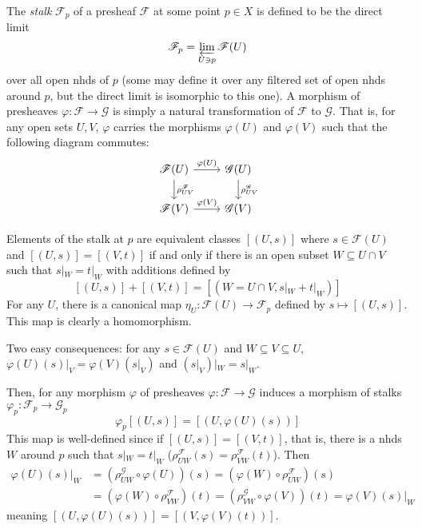 \documentclass[12pt]{article}
\theoremstyle{remark}
\begin{document}
    The \textit{stalk} $\mathscr F_p$ of a presheaf $\mathscr F$ at some point $p\in X$ is defined to be the direct limit
    \[\mathscr F_p=\varprojlim_{U\ni p} \mathscr F(U)\] 
    over all open nhds of $p$ (some may define it over any filtered set of open nhds around $p$, but the direct limit is isomorphic to this one). A morphism of presheaves $\varphi:\mathscr F\to\mathscr G$ is simply a natural transformation of $\mathscr F$ to $\mathscr G$. That is, for any open sets $U, V$, $\varphi$ carries the morphisms $\varphi(U)$ and $\varphi(V)$ such that the following diagram commutes:
    \[
\begin{tikzcd}
\mathscr F(U) \arrow[d, "\rho_{UV}^{\mathscr F}"] \arrow[r, "\varphi(U)"] & \mathscr G(U) \arrow[d, "\rho_{UV}^{\mathscr G}"] \\
\mathscr F(V) \arrow[r, "\varphi(V)"]                                     & \mathscr G(V)                                    
\end{tikzcd}    
    \]
    
    Elements of the stalk at $p$ are equivalent classes $[(U, s)]$ where $s\in\mathscr F(U)$ and $[(U, s)]=[(V, t)]$ if and only if there is an open subset $W\subseteq U\cap V$ such that $s|_W=t|_W$ with additions defined by 
    \[[(U, s)]+[(V, t)]=[(W=U\cap V,s|_W+t|_W)]\] 
    For any $U$, there is a canonical map $\eta_U:\mathscr F(U)\to \mathscr F_p$ defined by $s\mapsto [(U, s)]$. This map is clearly a homomorphism.
    
    Two easy consequences: for any $s\in\mathscr F(U)$ and $W\subseteq V\subseteq U$, $\varphi(U)(s)|_V=\varphi(V)(s|_V)$ and $\left(s|_V\right)|_W=s|_W$.
    
    Then, for any morphism $\varphi$ of presheaves $\varphi: \mathscr F\to\mathscr G$ induces a morphism of stalks $\varphi_p:\mathscr F_p\to\mathscr G_p$
    \[\varphi_p[(U, s)]=[(U, \varphi(U)(s))]\]
    This map is well-defined since if $[(U, s)]=[(V, t)]$, that is, there is a nhds $W$ around $p$ such that $s|_W = t|_W$ ($\rho^{\mathscr F}_{UW}(s)=\rho^{\mathscr F}_{VW}(t)$). Then
    \begin{align*}
    \varphi(U)(s)|_W&=(\rho^\mathscr{G}_{UW}\circ \varphi(U))(s)=(\varphi(W) \circ \rho^{\mathscr F}_{UW})(s)\\
    &=(\varphi(W) \circ \rho^{\mathscr F}_{VW})(t) = (\rho^\mathscr{G}_{VW} \circ \varphi (V))(t)=\varphi(V)(s)|_W
    \end{align*}
    meaning $[(U, \varphi(U)(s))]=[(V, \varphi(V)(t))]$.
    
\end{document}
